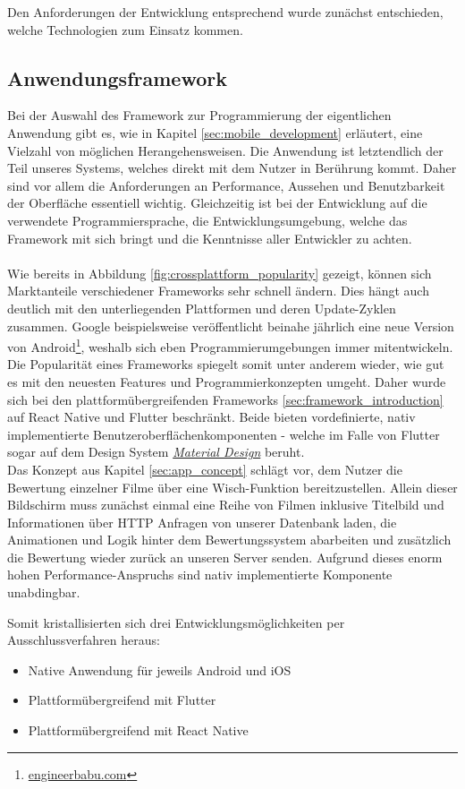 Den Anforderungen der Entwicklung entsprechend wurde zunächst entschieden, welche Technologien zum Einsatz kommen. 

\subsection{Anwendungsframework}
Bei der Auswahl des Framework zur Programmierung der eigentlichen Anwendung gibt es, wie in Kapitel \ref{sec:mobile_development} erläutert, eine Vielzahl von möglichen Herangehensweisen.
Die Anwendung ist letztendlich der Teil unseres Systems, welches direkt mit dem Nutzer in Berührung kommt.
Daher sind vor allem die Anforderungen an Performance, Aussehen und Benutzbarkeit der Oberfläche essentiell wichtig.
Gleichzeitig ist bei der Entwicklung auf die verwendete Programmiersprache, die Entwicklungsumgebung, welche das Framework mit sich bringt und die Kenntnisse aller Entwickler zu achten.\\
\\
Wie bereits in Abbildung \ref{fig:crossplattform_popularity} gezeigt, können sich Marktanteile verschiedener Frameworks sehr schnell ändern. 
Dies hängt auch deutlich mit den unterliegenden Plattformen und deren Update-Zyklen zusammen.
Google beispielsweise veröffentlicht beinahe jährlich eine neue Version von Android\footnote{\href{https://engineerbabu.com/blog/evolution-of-android-versions/}{engineerbabu.com}}, weshalb sich eben Programmierumgebungen immer mitentwickeln.
Die Popularität eines Frameworks spiegelt somit unter anderem wieder, wie gut es mit den neuesten Features und Programmierkonzepten umgeht. 
Daher wurde sich bei den plattformübergreifenden Frameworks \ref{sec:framework_introduction} auf React Native und Flutter beschränkt. 
Beide bieten vordefinierte, nativ implementierte Benutzeroberflächenkomponenten - welche im Falle von Flutter sogar auf dem Design System \href{https://material.io/}{\textit{Material Design}} beruht.\\
Das Konzept aus Kapitel \ref{sec:app_concept} schlägt vor, dem Nutzer die Bewertung einzelner Filme über eine Wisch-Funktion bereitzustellen.
Allein dieser Bildschirm muss zunächst einmal eine Reihe von Filmen inklusive Titelbild und Informationen über HTTP Anfragen von unserer Datenbank laden, die Animationen und Logik hinter dem Bewertungssystem abarbeiten und zusätzlich die Bewertung wieder zurück an unseren Server senden.
Aufgrund dieses enorm hohen Performance-Anspruchs sind nativ implementierte Komponente unabdingbar.

Somit kristallisierten sich drei Entwicklungsmöglichkeiten per Ausschlussverfahren heraus:
\begin{itemize}
	\item Native Anwendung für jeweils Android und iOS
	\item Plattformübergreifend mit Flutter
	\item Plattformübergreifend mit React Native
\end{itemize}

